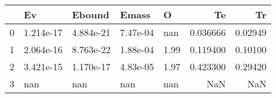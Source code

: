 \begin{tabular}{lllllrr}
\toprule
{} &         Ev &     Ebound &     Emass &     O &        Te &       Tr \\
\midrule
0 &  1.214e-17 &  4.884e-21 &  7.47e-04 &   nan &  0.036666 &  0.02949 \\
1 &  2.064e-16 &  8.763e-22 &  1.88e-04 &  1.99 &  0.119400 &  0.10100 \\
2 &  3.421e-15 &  1.170e-17 &  4.83e-05 &  1.97 &  0.423300 &  0.29420 \\
3 &        nan &        nan &       nan &   nan &       NaN &      NaN \\
\bottomrule
\end{tabular}
